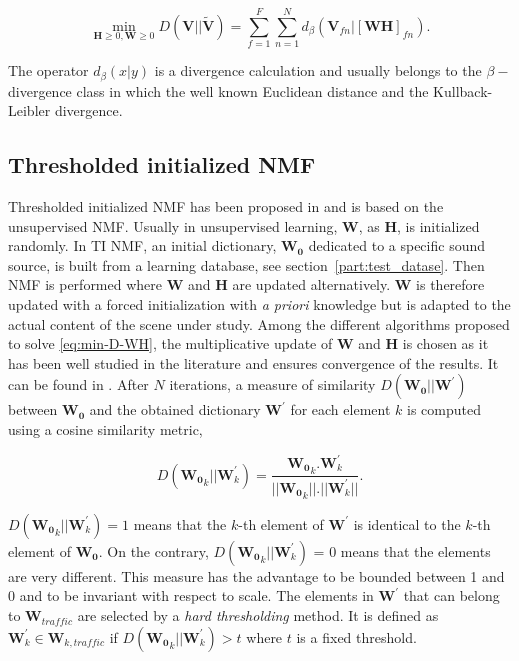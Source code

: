 \documentclass[12pt,english,twoside]{article}
\begin{document}
\begin{equation}\label{eq:min-D-WH}
\underset{\mathbf{H} \geq 0, \mathbf{W} \geq 0}{\min} D\left(\mathbf{V} \vert \vert \mathbf{\tilde{V}}\right) = \sum_{f = 1}^{F} \sum_{n = 1}^{N} d_{\beta}
\left(\textbf{V}_{fn} \vert \left[ \textbf{WH} \right]_{fn} \right).
\end{equation}

The operator $d_{\beta}(x\vert y)$ is a divergence calculation and usually belongs to the $\beta-$divergence class \cite{fevotte_nonnegative_2009} in which the well known Euclidean distance and the Kullback-Leibler divergence.

\subsection{Thresholded initialized NMF}
Thresholded initialized NMF has been proposed in \cite{gloaguen2019road} and is based on the unsupervised NMF. Usually in unsupervised learning, $\mathbf{W}$, as  $\mathbf{H}$, is initialized randomly. In TI NMF, an initial dictionary, $\mathbf{W_0}$ dedicated to a specific sound source, is built from a learning database, see section~\ref{part:test_datase}.
Then NMF is performed where $\mathbf{W}$ and $\mathbf{H}$ are updated alternatively. $\mathbf{W}$ is therefore updated with a forced initialization with \textit{a priori} knowledge but is adapted to the actual content of the scene under study. Among the different algorithms proposed to solve \ref{eq:min-D-WH}, the multiplicative update of $\mathbf{W}$ and $\mathbf{H}$ is chosen as it has been well studied in the literature and ensures convergence of the results. It can be found in \cite{fevotte_algorithms_2011}.
After $N$ iterations, a measure of similarity $D\left(\mathbf{W_0} \vert \vert \mathbf{W}^{'} \right)$ between $\mathbf{W_0}$ and the obtained dictionary $\mathbf{W}^{'}$ for each element $k$ is computed using a cosine similarity metric,

\begin{equation}
D\left(\mathbf{W_0}_k \vert \vert \mathbf{W}^{'}_k \right) = \frac{\mathbf{W_0}_k.\mathbf{W}^{'}_k}{\vert \vert \mathbf{W_0}_k  \vert \vert . \vert \vert \mathbf{W}^{'}_k \vert \vert}.
\end{equation}

$D\left(\mathbf{W_0}_k \vert \vert \mathbf{W}^{'}_k \right) = 1$ means that the $k$-th element of $\mathbf{W}^{'}$ is identical to the $k$-th element of $\mathbf{W_0}$. On the contrary, $D\left(\mathbf{W_0}_k \vert \vert \mathbf{W}^{'}_k \right)$ = 0 means that the elements are very different. This measure has the advantage to be bounded between 1 and 0 and to be invariant with respect to scale. The elements in $\mathbf{W}^{'}$ that can belong to $\mathbf{W}_{traffic}$ are selected by a \textit{hard thresholding} method. It is defined as $\mathbf{W}^{'}_k \in \mathbf{W}_{k,traffic}$ if $D\left(\mathbf{W_0}_k \vert \vert \mathbf{W}^{'}_{k} \right) > t$ where $t$ is a fixed threshold.
\end{document}
